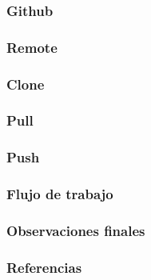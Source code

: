 \documentclass{beamer}
\begin{document}
\begin{frame}
\frametitle{Github}
\end{frame}

\begin{frame}
\frametitle{Remote}
\end{frame}

\begin{frame}
\frametitle{Clone}
\end{frame}

\begin{frame}
\frametitle{Pull}
\end{frame}

\begin{frame}
\frametitle{Push}
\end{frame}

\begin{frame}
\frametitle{Flujo de trabajo}
\end{frame}

\begin{frame}
\frametitle{Observaciones finales}
\end{frame}

\begin{frame}
  \frametitle{Referencias}
\end{frame}
\end{document}
